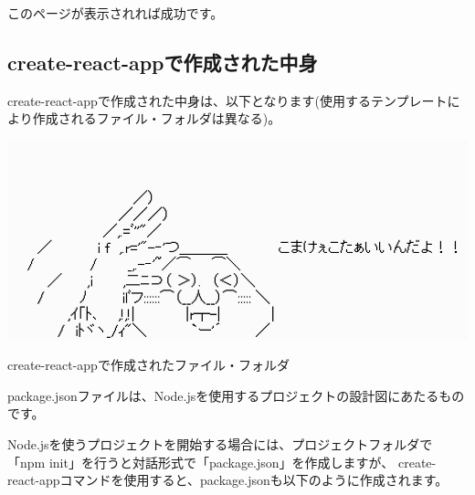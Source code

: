 このページが表示されれば成功です。


\clearpage


\subsection{create{-}react{-}appで作成された中身}
\keeplastskip{
  \label{sec:2-1-2}
  \label{sec-03cra-desc}
  \par\nobreak
}

create{-}react{-}appで作成された中身は、以下となります(使用するテンプレートにより作成されるファイル・フォルダは異なる)。

\begin{reviewimage}[H]%
\includegraphics[width=0.7\maxwidth]{./images/02-create-react-app/noMatter.png}%
\label{image:02-create-react-app:noMatter}
\end{reviewimage}
\def\startercodeblockfontsize{}
\begin{starterterminal}[]{create{-}react{-}appで作成されたファイル・フォルダ}\end{starterterminal}

package.jsonファイルは、Node.jsを使用するプロジェクトの設計図にあたるものです。

\vspace*{\baselineskip}

Node.jsを使うプロジェクトを開始する場合には、プロジェクトフォルダで「npm init」を行うと対話形式で「package.json」を作成しますが、
create{-}react{-}appコマンドを使用すると、package.jsonも以下のように作成されます。


